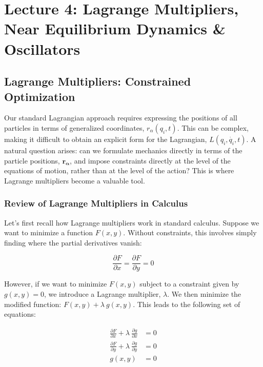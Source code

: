 \section{Lecture 4: Lagrange Multipliers, Near Equilibrium Dynamics \& Oscillators}

\subsection{Lagrange Multipliers: Constrained Optimization}

Our standard Lagrangian approach requires expressing the positions of all particles in 
terms of generalized coordinates, $r_\alpha\left(q_i, t\right)$. This can be complex, 
making it difficult to obtain an explicit form for the Lagrangian, 
$L\left(q_i, \dot{q_i}, t\right)$. A natural question arises: can we formulate mechanics 
directly in terms of the particle positions, $\mathbf{r_\alpha}$, and impose constraints
directly at the level of the equations of motion, rather than at the level of the action?
This is where Lagrange multipliers become a valuable tool.

\subsubsection{Review of Lagrange Multipliers in Calculus}

Let's first recall how Lagrange multipliers work in standard calculus. Suppose we want to 
minimize a function $F\left(x, y\right)$. Without constraints, this involves simply 
finding where the partial derivatives vanish:

\begin{equation}
    \frac{\partial F}{\partial x} = \frac{\partial F}{\partial y} = 0
\end{equation}

However, if we want to minimize $F\left(x, y\right)$ subject to a constraint given by 
$g\left(x, y\right) = 0$, we introduce a Lagrange multiplier, $\lambda$.  We then 
minimize the modified function: $F\left(x, y\right) + \lambda \ g\left(x, y\right)$. This 
leads to the following set of equations:

\begin{align}
    \frac{\partial F}{\partial x} + \lambda \ \frac{\partial g}{\partial x} &= 0 \\
    \frac{\partial F}{\partial y} + \lambda \ \frac{\partial g}{\partial y} &= 0 \\
    g\left(x, y\right) &= 0 
\end{align}

